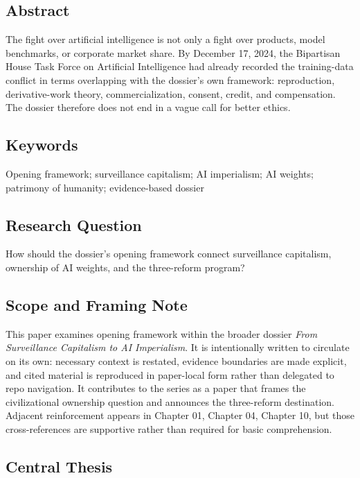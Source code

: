 \documentclass[
  american,
  11pt,
  letterpaper,
]{article}
\begin{document}
\subsection{Abstract}\label{abstract}

The fight over artificial intelligence is not only a fight over
products, model benchmarks, or corporate market share. By December 17,
2024, the Bipartisan House Task Force on Artificial Intelligence had
already recorded the training-data conflict in terms overlapping with
the dossier's own framework: reproduction, derivative-work theory,
commercialization, consent, credit, and compensation. The dossier
therefore does not end in a vague call for better ethics.

\subsection{Keywords}\label{keywords}

Opening framework; surveillance capitalism; AI imperialism; AI weights;
patrimony of humanity; evidence-based dossier

\subsection{Research Question}\label{research-question}

How should the dossier's opening framework connect surveillance
capitalism, ownership of AI weights, and the three-reform program?

\subsection{Scope and Framing Note}\label{scope-and-framing-note}

This paper examines opening framework within the broader dossier
\emph{From Surveillance Capitalism to AI Imperialism}. It is
intentionally written to circulate on its own: necessary context is
restated, evidence boundaries are made explicit, and cited material is
reproduced in paper-local form rather than delegated to repo navigation.
It contributes to the series as a paper that frames the civilizational
ownership question and announces the three-reform destination. Adjacent
reinforcement appears in Chapter 01, Chapter 04, Chapter 10, but those
cross-references are supportive rather than required for basic
comprehension.

\subsection{Central Thesis}\label{central-thesis}
\end{document}
